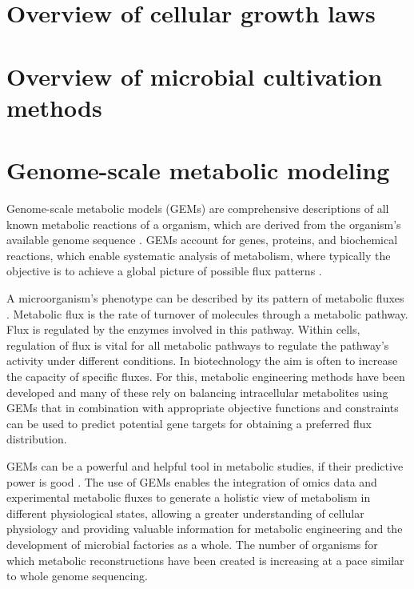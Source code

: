 \section{Overview of cellular growth laws}



\section{Overview of microbial cultivation methods}


\section{Genome-scale metabolic modeling} %

Genome-scale metabolic models (GEMs) are comprehensive descriptions of all known metabolic reactions of a
organism, which are derived from the organism's available genome sequence \cite{Kerkhoven2014}. 
GEMs account for genes, proteins, and biochemical reactions, which enable systematic
analysis of metabolism, where typically the objective is to achieve a global picture of possible flux
patterns \cite{Kerkhoven2014}\cite{Chen2023}. 

A microorganism's phenotype can be described by its pattern of metabolic fluxes \cite{Kerkhoven2014}. 
Metabolic flux is the rate of turnover of molecules through a metabolic pathway. Flux is regulated by the enzymes involved in this pathway. Within cells, 
regulation of flux is vital for all metabolic pathways to regulate the pathway's activity under different conditions. \cite{Voet1995} In biotechnology the aim is often 
to increase the capacity of specific fluxes. For this, metabolic engineering methods have been developed and many of these 
rely on balancing intracellular metabolites using GEMs that in
combination with appropriate objective functions and constraints can be used to predict potential gene 
targets for obtaining a preferred flux distribution. \cite{Kerkhoven2014} 

GEMs can be a powerful and helpful tool in metabolic studies, if their predictive 
power is good \cite{Rekena2023}. The use of GEMs enables the integration of omics data and experimental metabolic fluxes to generate a holistic 
view of metabolism in different physiological states, allowing a greater understanding of cellular physiology and providing valuable information 
for metabolic engineering and the development of microbial factories as a whole. \cite{DeBiaggi2023} The number of organisms for which metabolic 
reconstructions have been created is increasing at a pace similar to whole genome sequencing. \cite{Thiele2010}

